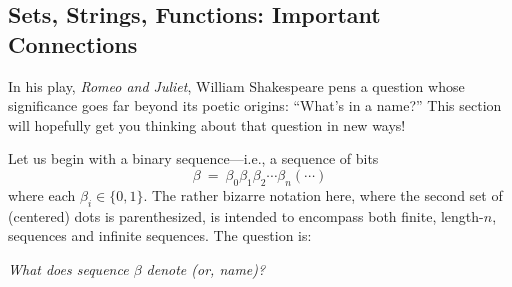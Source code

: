 \subsection{Sets, Strings, Functions: Important Connections}
\label{sec:sets-strings-functions}

In his play, {\it Romeo and Juliet}, William Shakespeare
 pens a question
whose significance goes far beyond its poetic origins: ``What's in a
name?''  This section will hopefully get you thinking about that
question in new ways!

Let us begin with a binary sequence---i.e., a sequence of bits
\[ \beta \ = \ \beta_0 \beta_1 \beta_2 \cdots \beta_n (\cdots) \]
where each $\beta_i \in \{0,1\}$.  The rather bizarre notation here,
where the second set of (centered) dots is parenthesized, is intended
to encompass both finite, length-$n$, sequences and infinite
sequences.  The question is:

{\em What does sequence $\beta$ denote (or, name)?}

